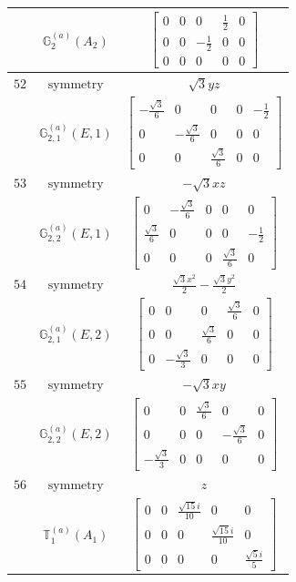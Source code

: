 \documentclass[fleqn,8pt,landscape]{jsarticle}
\begin{document}
\begin{longtable}{ccc}
$  $ & $ \mathbb{G}_{2}^{(a)}(A_{2}) $ & $ \begin{bmatrix} 0 & 0 & 0 & \frac{1}{2} & 0 \\ 0 & 0 & - \frac{1}{2} & 0 & 0 \\ 0 & 0 & 0 & 0 & 0 \end{bmatrix} $ \\ \hline
$ 52 $ & $ \text{symmetry} $ & $ \sqrt{3} y z $ \\
$  $ & $ \mathbb{G}_{2,1}^{(a)}(E,1) $ & $ \begin{bmatrix} - \frac{\sqrt{3}}{6} & 0 & 0 & 0 & - \frac{1}{2} \\ 0 & - \frac{\sqrt{3}}{6} & 0 & 0 & 0 \\ 0 & 0 & \frac{\sqrt{3}}{6} & 0 & 0 \end{bmatrix} $ \\ \hline
$ 53 $ & $ \text{symmetry} $ & $ - \sqrt{3} x z $ \\
$  $ & $ \mathbb{G}_{2,2}^{(a)}(E,1) $ & $ \begin{bmatrix} 0 & - \frac{\sqrt{3}}{6} & 0 & 0 & 0 \\ \frac{\sqrt{3}}{6} & 0 & 0 & 0 & - \frac{1}{2} \\ 0 & 0 & 0 & \frac{\sqrt{3}}{6} & 0 \end{bmatrix} $ \\ \hline
$ 54 $ & $ \text{symmetry} $ & $ \frac{\sqrt{3} x^{2}}{2} - \frac{\sqrt{3} y^{2}}{2} $ \\
$  $ & $ \mathbb{G}_{2,1}^{(a)}(E,2) $ & $ \begin{bmatrix} 0 & 0 & 0 & \frac{\sqrt{3}}{6} & 0 \\ 0 & 0 & \frac{\sqrt{3}}{6} & 0 & 0 \\ 0 & - \frac{\sqrt{3}}{3} & 0 & 0 & 0 \end{bmatrix} $ \\ \hline
$ 55 $ & $ \text{symmetry} $ & $ - \sqrt{3} x y $ \\
$  $ & $ \mathbb{G}_{2,2}^{(a)}(E,2) $ & $ \begin{bmatrix} 0 & 0 & \frac{\sqrt{3}}{6} & 0 & 0 \\ 0 & 0 & 0 & - \frac{\sqrt{3}}{6} & 0 \\ - \frac{\sqrt{3}}{3} & 0 & 0 & 0 & 0 \end{bmatrix} $ \\ \hline
$ 56 $ & $ \text{symmetry} $ & $ z $ \\
$  $ & $ \mathbb{T}_{1}^{(a)}(A_{1}) $ & $ \begin{bmatrix} 0 & 0 & \frac{\sqrt{15} i}{10} & 0 & 0 \\ 0 & 0 & 0 & \frac{\sqrt{15} i}{10} & 0 \\ 0 & 0 & 0 & 0 & \frac{\sqrt{5} i}{5} \end{bmatrix} $ \\ \hline

\end{longtable}
\end{document}
